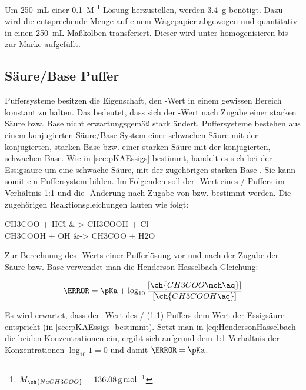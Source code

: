 \documentclass{article}
\begin{document}
         Um \SI[mode=text]{250}{\milli\liter} einer \SI[mode=text]{0.1}{M} \footnote{$M_{\ch{NaCH3COO}} = \SI[mode=text]{136.08}{\gram\per\mole}$} Lösung herzustellen, werden \SI[mode=text]{3.4}{\gram} benötigt. Dazu wird die entsprechende Menge auf einem Wägepapier abgewogen und quantitativ in einen \SI[mode=text]{250}{\milli\liter} Maßkolben transferiert. Dieser wird unter homogenisieren bis zur Marke aufgefüllt. 
    
    \subsection{Säure/Base Puffer} \label{sec:SauerBase}
    
      Puffersysteme besitzen die Eigenschaft, den \pH-Wert in einem gewissen Bereich konstant zu halten. Das bedeutet, dass sich der \pH-Wert nach Zugabe einer starken Säure bzw. Base nicht erwartungsgemäß stark ändert. Puffersysteme bestehen aus einem konjugierten Säure/Base System einer schwachen Säure mit der konjugierten, starken Base bzw. einer starken Säure mit der konjugierten, schwachen Base. Wie in \ref{sec:pKAEssigs} bestimmt, handelt es sich bei der Essigsäure um eine schwache Säure, mit der zugehörigen starken Base . Sie kann somit ein Puffersystem bilden. Im Folgenden soll der \pH-Wert eines / Puffers im Verhältnis 1:1 und die \pH-Änderung nach Zugabe von  bzw.  bestimmt werden. Die zugehörigen Reaktionsgleichungen lauten wie folgt:
      
      \begin{reactions}
        CH3COO\mch\aq{} + HCl\aq{} &-> CH3COOH\aq{} + Cl\mch\aq{} \label{rec:Protonenzugabe} \\
        CH3COOH\aq{} + OH\mch\aq{} &-> CH3COO\mch\aq{} + H2O 
      \end{reactions} 
      
      Zur Berechnung des \pH-Werts einer Pufferlösung vor und nach der Zugabe der Säure bzw. Base verwendet man die Henderson-Hasselbach Gleichung:
      
      \begin{equation}
        \pH = \pKa + \log _{10} \frac{[\ch{CH3COO\mch\aq}]}{[\ch{CH3COOH\aq}]} \label{eq:HendersonHasselbach}
      \end{equation}
      
      Es wird erwartet, dass der \pH-Wert des / (1:1) Puffers dem \pKa Wert der Essigsäure entspricht (in \ref{sec:pKAEssigs} bestimmt). Setzt man in \eqref{eq:HendersonHasselbach} die beiden Konzentrationen ein, ergibt sich aufgrund dem 1:1 Verhältnis der Konzentrationen $\log _{10} 1 = 0$ und damit $\pH = \pKa$. \\
      
\end{document}
